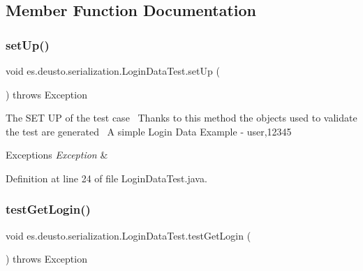 \subsection{Member Function Documentation}
\mbox{\label{classes_1_1deusto_1_1serialization_1_1_login_data_test_ac6ebc4ad7913f80cdd7e5ca1de3bc8c3}} 
\subsubsection{\texorpdfstring{set\+Up()}{setUp()}}
{\footnotesize\ttfamily void es.\+deusto.\+serialization.\+Login\+Data\+Test.\+set\+Up (\begin{DoxyParamCaption}{ }\end{DoxyParamCaption}) throws Exception}

The S\+ET UP of the test case~\newline
Thanks to this method the objects used to validate the test are generated~\newline
A simple Login Data Example -\/ user,12345 
\begin{DoxyExceptions}{Exceptions}
{\em Exception} & \\
\hline
\end{DoxyExceptions}


Definition at line 24 of file Login\+Data\+Test.\+java.

\mbox{\label{classes_1_1deusto_1_1serialization_1_1_login_data_test_af8335d8d384051b02dc6bb2db7d6c9e2}} 
\subsubsection{\texorpdfstring{test\+Get\+Login()}{testGetLogin()}}
{\footnotesize\ttfamily void es.\+deusto.\+serialization.\+Login\+Data\+Test.\+test\+Get\+Login (\begin{DoxyParamCaption}{ }\end{DoxyParamCaption}) throws Exception}

